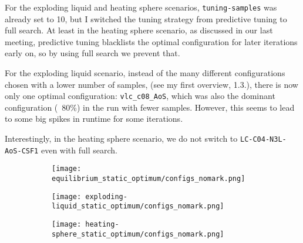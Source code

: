 \documentclass[]{article}
\begin{document}
For the exploding liquid and heating sphere scenarios,  \texttt{tuning-samples} was already set to 10, but I switched the tuning strategy from predictive tuning to full search. At least in the heating sphere scenario, as discussed in our last meeting, predictive tuning blacklists the optimal configuration for later iterations early on, so by using full search we prevent that.

For the exploding liquid scenario, instead of the many different configurations chosen with a lower number of samples, (see my first overview, 1.3.), there is now only one optimal configuration: \texttt{vlc\_c08\_AoS}, which was also the dominant configuration (~80\%) in the run with fewer samples. However, this seems to lead to some big spikes in runtime for some iterations.

Interestingly, in the heating sphere scenario, we do not switch to \texttt{LC-C04-N3L-AoS-CSF1} even with full search.


\begin{figure}[H]
	\begin{center}
		\begin{subfigure}[b]{0.3\textwidth}
			\texttt{[image: equilibrium\_static\_optimum/configs\_nomark.png]}
		\end{subfigure}
		\begin{subfigure}[b]{0.3\textwidth}
			\texttt{[image: exploding-liquid\_static\_optimum/configs\_nomark.png]}
		\end{subfigure}
		\begin{subfigure}[b]{0.3\textwidth}
			\texttt{[image: heating-sphere\_static\_optimum/configs\_nomark.png]}
		\end{subfigure}
	\end{center}
	\label{fig_opt}
\end{figure}

\end{document}
